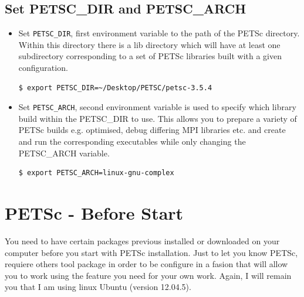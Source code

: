 \documentclass{article}
\begin{document}
\subsection{Set PETSC\_DIR and PETSC\_ARCH} 
\begin{itemize}
\item Set \verb+PETSC_DIR+, first environment variable to the path of the PETSc directory. Within this directory there is a lib directory
which will have at least one subdirectory corresponding to a set of PETSc libraries built with a given configuration.
\begin{verbatim}
$ export PETSC_DIR=~/Desktop/PETSC/petsc-3.5.4
\end{verbatim}
\item Set \verb+PETSC_ARCH+, second environment variable is used to specify which library build within the PETSC\_DIR to use. This allows you to prepare a variety of PETSc builds e.g. optimised, debug differing MPI libraries etc. and create and run the corresponding executables while only changing the PETSC\_ARCH variable.
\begin{verbatim}
$ export PETSC_ARCH=linux-gnu-complex
\end{verbatim}
\end{itemize}

\section{PETSc - Before Start}
You need to have certain packages previous installed or downloaded on your computer before you start with PETSc installation. Just to let you know PETSc, requiere others 
tool package in order to be configure in a fasion that will allow you to work using the feature you need for your own work. Again, I will remain you that I am using linux Ubuntu (version 12.04.5). 
\end{document}
